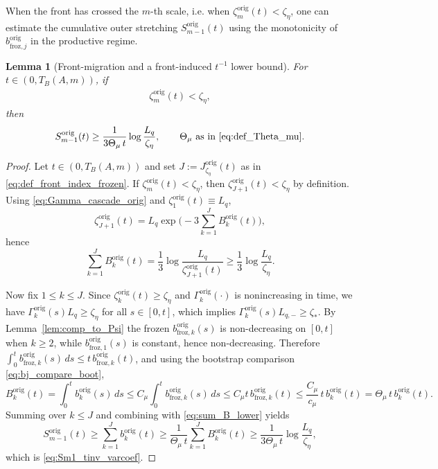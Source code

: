 \documentclass[reqno,11pt]{amsart}
\newtheorem{lemma}[theorem]{Lemma}
\begin{document}
When the front has crossed the $m$-th scale, i.e. when $\zeta_m^{\mathrm{orig}}(t) <\zeta_\eta$, one can estimate  the cumulative outer stretching $S_{m-1}^{\mathrm{orig}}(t)$ using the monotonicity of $b_{\mathrm{froz},j}^{\mathrm{orig}}$ in the productive regime.

\begin{lemma}[Front-migration and a front-induced $t^{-1}$ lower bound]
\label{lem:front_tinv_varcoef}
For  $t\in(0,T_B(A,m))$, if 
    \begin{align*}
    \zeta_m^{\mathrm{orig}}(t)<\zeta_\eta ,
    \end{align*}
 then
\begin{equation}
\label{eq:Sm1_tinv_varcoef}
S_{m-1}^{\mathrm{orig}}(t)\ge \frac{1}{3\Theta_\mu \,t}\log\frac{L_q}{\zeta_\eta},
\qquad \Theta_\mu\ \text{as in \eqref{eq:def_Theta_mu}}.
\end{equation}
\end{lemma}

\begin{proof}
Let $t\in(0,T_B(A,m))$ and set $J:=J_{\zeta_\eta}^{\mathrm{orig}}(t)$ as in \eqref{eq:def_front_index_frozen}.  If $\zeta_m^{\mathrm{orig}}(t)<\zeta_\eta$,
then $\zeta_{J+1}^{\mathrm{orig}}(t)<\zeta_\eta$ by definition.  Using \eqref{eq:Gamma_cascade_orig} and $\zeta_1^{\mathrm{orig}}(t)\equiv L_q$,
\[
\zeta_{J+1}^{\mathrm{orig}}(t)
=
L_q\exp\Big(-3\sum_{k=1}^{J}B_k^{\mathrm{orig}}(t)\Big),
\]
hence
\begin{equation}
\label{eq:sum_B_lower}
\sum_{k=1}^{J}B_k^{\mathrm{orig}}(t)
=
\frac13\log\frac{L_q}{\zeta_{J+1}^{\mathrm{orig}}(t)}
\ge
\frac13\log\frac{L_q}{\zeta_\eta}.
\end{equation}

Now fix $1\le k\le J$.  Since $\zeta_k^{\mathrm{orig}}(t)\ge\zeta_\eta$ and $\Gamma_k^{\mathrm{orig}}(\cdot)$ is nonincreasing in time,
we have $\Gamma_k^{\mathrm{orig}}(s)L_q\ge\zeta_\eta$ for all $s\in[0,t]$, which implies $\Gamma_k^{\mathrm{orig}}(s) L_{q,-}\geq \zeta_*$.  By Lemma~\ref{lem:comp_to_Psi}
 the frozen
$b_{\mathrm{froz},k}^{\mathrm{orig}}(s)$ is non-decreasing on $[0,t]$ when $k\geq 2$, while $b_{\mathrm{froz},1}^{\mathrm{orig}}(s)$ is  constant, hence non-decreasing.  Therefore $\int_0^t b_{\mathrm{froz},k}^{\mathrm{orig}}(s)\,ds\le t\,b_{\mathrm{froz},k}^{\mathrm{orig}}(t)$, and using the
bootstrap comparison \eqref{eq:bj_compare_boot},
\[
B_k^{\mathrm{orig}}(t)
=
\int_0^t b_k^{\mathrm{orig}}(s)\,ds
\le
C_\mu\int_0^t b_{\mathrm{froz},k}^{\mathrm{orig}}(s)\,ds
\le
C_\mu t\,b_{\mathrm{froz},k}^{\mathrm{orig}}(t)
\le
\frac{C_\mu}{c_\mu}\,t\,b_k^{\mathrm{orig}}(t)
=
\Theta_\mu\,t\,b_k^{\mathrm{orig}}(t).
\]
Summing over $k\le J$ and combining with \eqref{eq:sum_B_lower} yields
\[
S_{m-1}^{\mathrm{orig}}(t)
\ge
\sum_{k=1}^{J}b_k^{\mathrm{orig}}(t)
\ge
\frac{1}{\Theta_\mu\,t}\sum_{k=1}^{J}B_k^{\mathrm{orig}}(t)
\ge
\frac{1}{3\Theta_\mu \,t}\log\frac{L_q}{\zeta_\eta},
\]
which is \eqref{eq:Sm1_tinv_varcoef}.
\end{proof}
\end{document}
